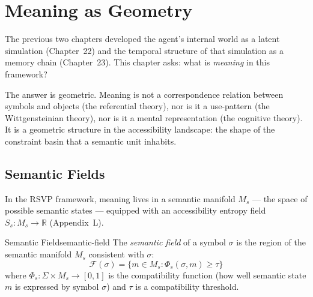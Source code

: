 
\chapter{Meaning as Geometry}



The previous two chapters developed the agent's internal world as a
latent simulation (Chapter~22) and the temporal structure of that
simulation as a memory chain (Chapter~23). This chapter asks: what is
\emph{meaning} in this framework?

The answer is geometric. Meaning is not a correspondence relation
between symbols and objects (the referential theory), nor is it a
use-pattern (the Wittgensteinian theory), nor is it a mental representation
(the cognitive theory). It is a geometric structure in the accessibility
landscape: the shape of the constraint basin that a semantic unit inhabits.

\section{Semantic Fields}

In the RSVP framework, meaning lives in a semantic manifold $M_s$ —
the space of possible semantic states — equipped with an accessibility
entropy field $S_s : M_s \to \mathbb{R}$ (Appendix~L).

\begin{definition}{Semantic Field}{semantic-field}
  The \emph{semantic field} of a symbol $\sigma$ is the region of the
  semantic manifold $M_s$ consistent with $\sigma$:
  \[
    \mathcal{F}(\sigma) = \{m \in M_s : \Phi_s(\sigma, m) \geq \tau\}
  \]
  where $\Phi_s : \Sigma \times M_s \to [0,1]$ is the compatibility
  function (how well semantic state $m$ is expressed by symbol $\sigma$)
  and $\tau$ is a compatibility threshold.
\end{definition}

